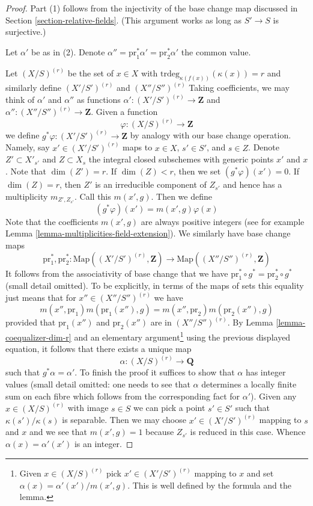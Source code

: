 \documentclass{stacks-project}
\theoremstyle{plain}
\theoremstyle{definition}
\theoremstyle{remark}
\numberwithin{equation}{subsection}
\begin{document}
\begin{proof}
Part (1) follows from the injectivity of the base change map discussed
in Section \ref{section-relative-fields}. (This argument works as
long as $S' \to S$ is surjective.)

\medskip\noindent
Let $\alpha'$ be as in (2). Denote
$\alpha'' = \text{pr}_1^*\alpha' = \text{pr}_2^*\alpha'$
the common value.

\medskip\noindent
Let $(X/S)^{(r)}$ be the set of $x \in X$ with
$\text{trdeg}_{\kappa(f(x))}(\kappa(x)) = r$
and similarly define $(X'/S')^{(r)}$ and $(X''/S'')^{(r)}$
Taking coefficients, we may think of $\alpha'$ and $\alpha''$ as functions
$\alpha' : (X'/S')^{(r)} \to \mathbf{Z}$ and
$\alpha'' : (X''/S'')^{(r)} \to \mathbf{Z}$.
Given a function
$$
\varphi : (X/S)^{(r)} \to \mathbf{Z}
$$
we define $g^*\varphi : (X'/S')^{(r)} \to \mathbf{Z}$ by analogy
with our base change operation. Namely, say $x' \in (X'/S')^{(r)}$
maps to $x \in X$, $s' \in S'$, and $s \in Z$.
Denote $Z' \subset X'_{s'}$ and $Z \subset X_s$ the integral
closed subschemes with generic points $x'$ and $x$. Note
that $\dim(Z') = r$. If $\dim(Z) < r$, then we set $(g^*\varphi)(x') = 0$.
If $\dim(Z) = r$, then $Z'$ is an irreducible component of $Z_{s'}$ and
hence has a multiplicity $m_{Z', Z_{s'}}$. Call this $m(x', g)$.
Then we define
$$
(g^*\varphi)(x') = m(x', g) \varphi(x)
$$
Note that the coefficients $m(x', g)$ are always positive integers
(see for example Lemma \ref{lemma-multiplicities-field-extension}).
We similarly have base change maps
$$
\text{pr}_1^*, \text{pr}_2^* :
\text{Map}((X'/S')^{(r)}, \mathbf{Z})
\longrightarrow
\text{Map}((X''/S'')^{(r)}, \mathbf{Z})
$$
It follows from the associativity of base change that we have
$\text{pr}_1^* \circ g^* = \text{pr}_2^* \circ g^*$ (small detail
omitted). To be explicitly, in terms of the maps of sets this
equality just means that for $x'' \in (X''/S'')^{(r)}$ we have
$$
m(x'', \text{pr}_1) m(\text{pr}_1(x''), g) =
m(x'', \text{pr}_2) m(\text{pr}_2(x''), g)
$$
provided that $\text{pr}_1(x'')$ and $\text{pr}_2(x'')$ are
in $(X''/S'')^{(r)}$.
By Lemma \ref{lemma-coequalizer-dim-r} and an elementary
argument\footnote{Given $x \in (X/S)^{(r)}$ pick $x' \in (X'/S')^{(r)}$
mapping to $x$ and set $\alpha(x) = \alpha'(x')/m(x', g)$. This
is well defined by the formula and the lemma.}
using the previous displayed equation,
it follows that there exists a unique map
$$
\alpha : (X/S)^{(r)} \to \mathbf{Q}
$$
such that $g^*\alpha = \alpha'$. To finish the proof it suffices
to show that $\alpha$ has integer values (small detail omitted: one
needs to see that $\alpha$ determines a locally finite sum on
each fibre which follows from the corresponding fact for $\alpha'$).
Given any $x \in (X/S)^{(r)}$ with image $s \in S$
we can pick a point $s' \in S'$ such that $\kappa(s')/\kappa(s)$
is separable. Then we may choose $x' \in (X'/S')^{(r)}$ mapping
to $s$ and $x$ and we see that $m(x', g) = 1$ because
$Z_{s'}$ is reduced in this case. Whence $\alpha(x) = \alpha'(x')$
is an integer.
\end{proof}
\end{document}
